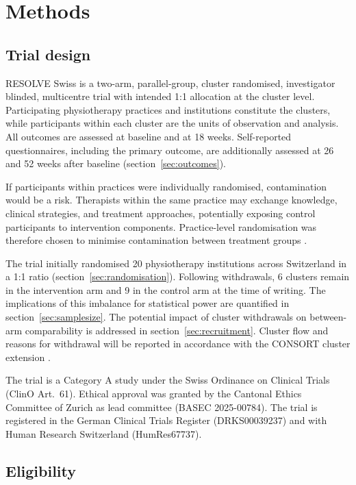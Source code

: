\documentclass[11pt,a4paper]{article}
\begin{document}
\section{Methods}

\subsection{Trial design}

RESOLVE Swiss is a two-arm, parallel-group, cluster randomised, investigator
blinded, multicentre trial with intended 1:1 allocation at the cluster level.
Participating physiotherapy practices and institutions constitute the
clusters, while participants within each cluster are the units of observation
and analysis. All outcomes are assessed at baseline and at 18 weeks.
Self-reported questionnaires, including the primary outcome, are additionally
assessed at 26 and 52 weeks after baseline (section~\ref{sec:outcomes}).

If participants within practices were individually randomised, contamination
would be a risk. Therapists within the same practice may exchange knowledge,
clinical strategies, and treatment approaches, potentially exposing control
participants to intervention components. Practice-level randomisation was
therefore chosen to minimise contamination between treatment groups
\citep{campbell2012}.

The trial initially randomised 20 physiotherapy institutions across
Switzerland in a 1:1 ratio (section~\ref{sec:randomisation}). Following
withdrawals, 6 clusters remain in the intervention arm and 9 in the control
arm at the time of writing. The implications of this imbalance for statistical
power are quantified in section~\ref{sec:samplesize}. The potential impact of
cluster withdrawals on between-arm comparability is addressed in
section~\ref{sec:recruitment}. Cluster flow and reasons for withdrawal will be
reported in accordance with the CONSORT cluster extension
\citep{campbell2012}.

The trial is a Category A study under the Swiss Ordinance on Clinical Trials
(ClinO Art.~61). Ethical approval was granted by the Cantonal Ethics
Committee of Zurich as lead committee (BASEC 2025-00784). The trial is
registered in the German Clinical Trials Register (DRKS00039237) and with
Human Research Switzerland (HumRes67737).

\subsection{Eligibility}
\label{sec:eligibility}
\end{document}
